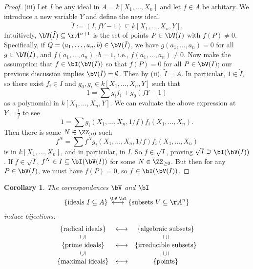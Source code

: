\documentclass[12pt]{amsart}
\theoremstyle{plain}
\newtheorem{corollary}[theorem]{Corollary}
\begin{document}
\begin{proof}
(iii) Let $I$ be any ideal in $A = k[X_1, \ldots, X_n]$ and let $f \in A$ be arbitary.
We introduce a new variable $Y$ and define the new ideal
$$\tilde I := (I, f Y - 1) \subseteq k[X_1, \ldots, X_n, Y].$$
Intuitively, $\bV(\tilde I) \subseteq \AA^{n+1}$ is the set of points $P \in \bV(I)$ with $f(P) \ne 0$.
Specifically, if $Q = (a_1, \ldots, a_n, b) \in \bV(\tilde I)$, we have $g(a_1, \ldots, a_n) = 0$ for all $g \in \bV(I)$, 
and $f(a_1, \ldots, a_n) \cdot b = 1$, i.e., $f(a_1, \ldots, a_n) \ne 0$.
Now make the assumption that $f \in \bI(\bV(I))$ so that $f(P) = 0$ for all $P \in \bV(I)$;
our previous discussion implies $\bV(\tilde I) = \emptyset$.
Then by (ii), $\tilde I = A$.
In particular, $1 \in \tilde I$, so there exist $f_i \in I$ and $g_0, g_i \in k[X_1, \ldots, X_n, Y]$ such that
$$1 = \sum g_i f_i + g_0 (f Y - 1)$$
as a polynomial in $k[X_1, \ldots, X_n, Y]$.
We can evaluate the above expression at $Y = \frac{1}{f}$ to see
$$1 = \sum g_i(X_1, \ldots, X_n, 1/f) f_i(X_1, \ldots, X_n).$$
Then there is some $N \in \ZZ_{> 0 }$ such
$$f^N = \sum f^N g_i (X_1, \ldots, X_n, 1/f) f_i(X_1,\ldots,X_n)$$
is in $k[X_1, \ldots, X_n]$, and in particular, in $I$.
So $f \in \sqrt{I}$, proving $\sqrt{I} \supseteq \bI(\bV(I))$.
If $f \in \sqrt{I}$, $f^N \in I \subseteq \bI(\bV(I))$ for some $N \in \ZZ_{\ge 0}$.
But then for any $P \in \bV(I)$, we must have $f(P) = 0$, so $f \in \bI(\bV(I))$.
\end{proof}

\begin{corollary}
The correspondences $\bV$ and $\bI$ 
$$\{\text{ideals } I \subseteq A\} \overset{\bV, \bI}{\longleftrightarrow} \{\text{subsets } V \subseteq \AA^n\}$$
induce bijections:
$$
\begin{array}{c}
\{\text{radical ideals}\} \\
\rotatebox[origin=c]{90}{$\subseteq$} \\
\{\text{prime ideals}\} \\
\rotatebox[origin=c]{90}{$\subseteq$} \\
\{\text{maximal ideals}\} 
\end{array}
\begin{array}{c}
\longleftrightarrow \\
\\
\longleftrightarrow \\
\\
\longleftrightarrow  
\end{array}
\begin{array}{c}
\{\text{algebraic subsets}\} \\
\rotatebox[origin=c]{90}{$\subseteq$} \\
\{\text{irreducible subsets}\} \\
\rotatebox[origin=c]{90}{$\subseteq$} \\
\{\text{points}\} 
\end{array}
$$
\end{corollary}
\end{document}
